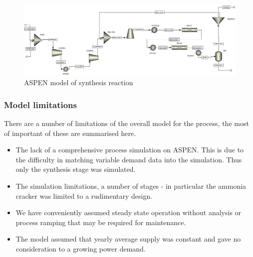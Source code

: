 \documentclass[11pt, a4paper]{article}
\begin{document}
{{\centering
	\begin{figure}[!htbp]
		\includegraphics[scale=0.48]{ASPEN_MODEL}
		\caption{ASPEN model of synthesis reaction 	\label{fig:aspenF}}
\end{figure}}
\subsubsection{Model limitations}
There are a number of limitations of the overall model for the process, the most of important of these are summarised here. 
\begin{itemize}
	\item The lack of a comprehensive process simulation on ASPEN. This is due to the difficulty in matching variable demand data into the simulation. Thus only the synthesis stage was simulated. 
\item The simulation limitations, a number of stages - in particular the ammonia cracker was limited to a rudimentary design. 
\item We have conveniently assumed steady state operation without analysis or process ramping that may be required for maintenance. 
\item The model assumed that yearly average supply was constant and gave no consideration to a growing power demand. 
\end{itemize}
}
\end{document}
